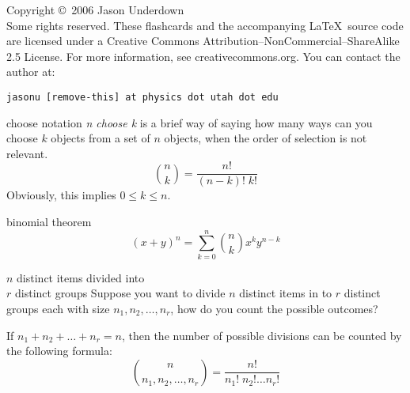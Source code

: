 \documentclass[avery5371,grid]{flashcards}
\begin{document}

\begin{flashcard}{Copyright \copyright \, 2006 Jason Underdown \\
Some rights reserved.}
These flashcards and the accompanying \LaTeX \, source code are licensed
under a Creative Commons Attribution--NonCommercial--ShareAlike 2.5 License.  
For more information, see creativecommons.org.  You can contact the author at:
\begin{center}
\begin{small}\tt jasonu [remove-this] at physics dot utah dot edu\end{small}
\end{center}
\end{flashcard}

\begin{flashcard}[Definition]{choose notation}
\textit{n choose k} is a brief way of saying how many ways can you choose $k$
objects from a set of $n$ objects, when the order of selection is not relevant.
\begin{displaymath}
{n \choose k} = \frac{n!}{(n-k)! \; k!}
\end{displaymath}
Obviously, this implies $0 \leq k \leq n$.
\end{flashcard}

\begin{flashcard}[Theorem]{binomial theorem}
\begin{displaymath}
(x + y)^n = \sum_{k=0}^{n} {n \choose k} x^k y^{n-k}
\end{displaymath}
\end{flashcard}

\begin{flashcard}[Definition]{$n$ distinct items divided into \\
$r$ distinct groups}
Suppose you want to divide $n$ distinct items in to $r$ distinct groups
each with size $n_1, n_2, \ldots, n_r$, how do you count the possible outcomes?

\smallskip
If $n_1 + n_2 + \ldots + n_r = n$, then the number of possible divisions can be
counted by the following formula:
\begin{displaymath}
{n \choose n_1, n_2, \ldots, n_r} = \frac{n!}{n_1! \; n_2! \ldots n_r!}
\end{displaymath}
\end{flashcard}
\end{document}
